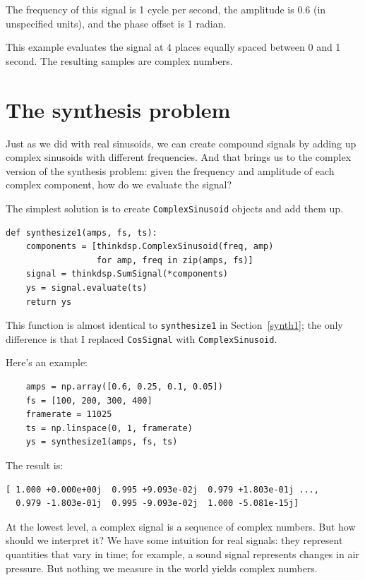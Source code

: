 \documentclass[12pt]{book}
\begin{document}
The frequency of this signal is 1 cycle per second, the amplitude
is 0.6 (in unspecified units), and the phase offset is 1 radian.

This example evaluates the signal at 4 places equally spaced between
0 and 1 second.  The resulting samples are complex numbers.


\section{The synthesis problem}

Just as we did with real sinusoids, we can create compound signals
by adding up complex sinusoids with different frequencies.  And that
brings us to the complex version of the synthesis problem: given the
frequency and amplitude of each complex component, how do we evaluate the
signal?

The simplest solution is to create {\tt ComplexSinusoid} objects and
add them up.

\begin{verbatim}
def synthesize1(amps, fs, ts):
    components = [thinkdsp.ComplexSinusoid(freq, amp)
                  for amp, freq in zip(amps, fs)]
    signal = thinkdsp.SumSignal(*components)
    ys = signal.evaluate(ts)
    return ys
\end{verbatim}

This function is almost identical to {\tt synthesize1} in
Section~\ref{synth1}; the only difference is that I replaced
{\tt CosSignal} with {\tt ComplexSinusoid}.

Here's an example:

\begin{verbatim}
    amps = np.array([0.6, 0.25, 0.1, 0.05])
    fs = [100, 200, 300, 400]
    framerate = 11025
    ts = np.linspace(0, 1, framerate)
    ys = synthesize1(amps, fs, ts)
\end{verbatim}

The result is:

\begin{verbatim}
[ 1.000 +0.000e+00j  0.995 +9.093e-02j  0.979 +1.803e-01j ...,
  0.979 -1.803e-01j  0.995 -9.093e-02j  1.000 -5.081e-15j]
\end{verbatim}

At the lowest level, a complex signal is a sequence of complex
numbers.  But how should we interpret it?  We have some intuition for
real signals: they represent quantities that vary in time; for
example, a sound signal represents changes in air pressure.
But nothing we measure in the world yields complex numbers.
\end{document}
